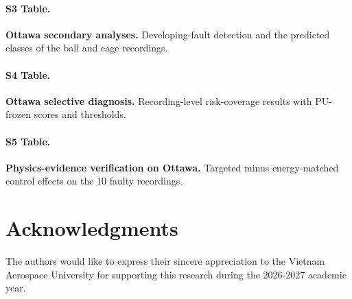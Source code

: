 \documentclass[10pt,letterpaper]{article}
\begin{document}
\paragraph*{S3 Table.}
\label{S3_Table}
\textbf{Ottawa secondary analyses.} Developing-fault detection and the predicted classes of the ball and cage recordings.

\paragraph*{S4 Table.}
\label{S4_Table}
\textbf{Ottawa selective diagnosis.} Recording-level risk-coverage results with PU-frozen scores and thresholds.

\paragraph*{S5 Table.}
\label{S5_Table}
\textbf{Physics-evidence verification on Ottawa.} Targeted minus energy-matched control effects on the 10 faulty recordings.

\section*{Acknowledgments}
The authors would like to express their sincere appreciation to the Vietnam Aerospace University for supporting this research during the 2026-2027 academic year.

\nolinenumbers


\end{document}
